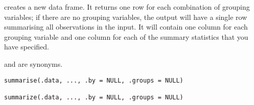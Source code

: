 \documentclass[a4paper]{book}
\begin{document}
%
\begin{Description}
 creates a new data frame. It returns one row for each
combination of grouping variables; if there are no grouping variables, the
output will have a single row summarising all observations in the input. It
will contain one column for each grouping variable and one column for each of
the summary statistics that you have specified.

 and  are synonyms.
\end{Description}
%
\begin{Usage}
\begin{verbatim}
summarise(.data, ..., .by = NULL, .groups = NULL)

summarize(.data, ..., .by = NULL, .groups = NULL)
\end{verbatim}
\end{Usage}
%
\end{document}
